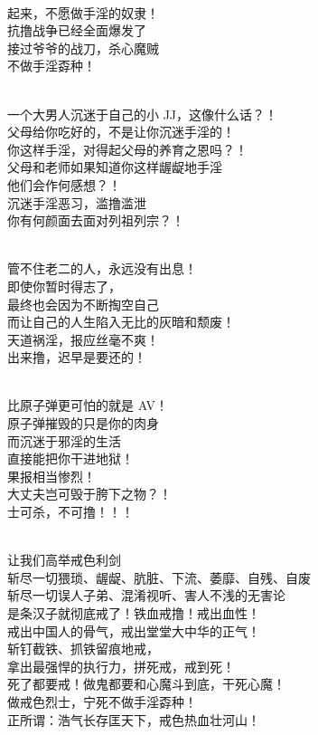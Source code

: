 \begin{poem}[抗撸战争]
    \begin{multicols}{2}
        \begin{center}~\\
            起来，不愿做手淫的奴隶！ \\ 抗撸战争已经全面爆发了 \\ 接过爷爷的战刀，杀心魔贼 \\ 不做手淫孬种！

            ~\\

            一个大男人沉迷于自己的小 JJ，这像什么话？！ \\ 父母给你吃好的，不是让你沉迷手淫的！ \\ 你这样手淫，对得起父母的养育之恩吗？！ \\ 父母和老师如果知道你这样龌龊地手淫 \\ 他们会作何感想？！ \\ 沉迷手淫恶习，滥撸滥泄 \\ 你有何颜面去面对列祖列宗？！

            ~\\

            管不住老二的人，永远没有出息！ \\             即使你暂时得志了， \\             最终也会因为不断掏空自己 \\             而让自己的人生陷入无比的灰暗和颓废！ \\             天道祸淫，报应丝毫不爽！ \\             出来撸，迟早是要还的！

            ~\\

            比原子弹更可怕的就是 AV！ \\ 原子弹摧毁的只是你的肉身 \\ 而沉迷于邪淫的生活 \\ 直接能把你干进地狱！ \\ 果报相当惨烈！ \\ 大丈夫岂可毁于胯下之物？！ \\ 士可杀，不可撸！！！

            ~\\

            让我们高举戒色利剑 \\ 斩尽一切猥琐、龌龊、肮脏、下流、萎靡、自残、自废 \\ 斩尽一切误人子弟、混淆视听、害人不浅的无害论 \\ 是条汉子就彻底戒了！铁血戒撸！戒出血性！ \\ 戒出中国人的骨气，戒出堂堂大中华的正气！ \\ 斩钉截铁、抓铁留痕地戒， \\ 拿出最强悍的执行力，拼死戒，戒到死！ \\ 死了都要戒！做鬼都要和心魔斗到底，干死心魔！ \\ 做戒色烈士，宁死不做手淫孬种！ \\ 正所谓：浩气长存匡天下，戒色热血壮河山！
        \end{center}
    \end{multicols}
\end{poem}


